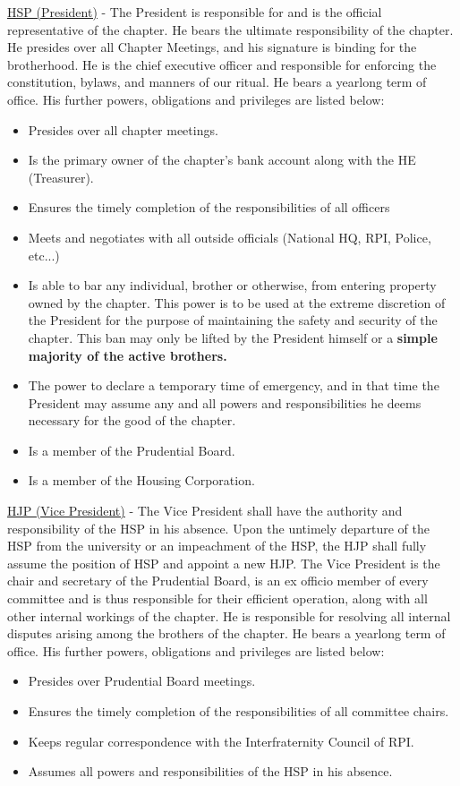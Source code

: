 \documentclass{article}
\begin{document}
\underline{HSP (President)} - The President is responsible for and is the official representative of the chapter. He bears the ultimate responsibility of the chapter. He presides over all Chapter Meetings, and his signature is binding for the brotherhood. He is the chief executive officer and responsible for enforcing the constitution, bylaws, and manners of our ritual. He bears a yearlong term of office. His further powers, obligations and privileges are listed below:
\begin{itemize}
    \item Presides over all chapter meetings.
    \item Is the primary owner of the chapter’s bank account along with the HE (Treasurer).
    \item Ensures the timely completion of the responsibilities of all officers
    \item Meets and negotiates with all outside officials (National HQ, RPI, Police, etc...)
    \item Is able to bar any individual, brother or otherwise, from entering property owned by the chapter. This power is to be used at the extreme discretion of the President for the purpose of maintaining the safety and security of the chapter. This ban may only be lifted by the President himself or a \textbf{simple majority of the active brothers.}
    \item The power to declare a temporary time of emergency, and in that time the President may assume any and all powers and responsibilities he deems necessary for the good of the chapter. 
    \item Is a member of the Prudential Board.
    \item Is a member of the Housing Corporation.
\end{itemize}

\underline{HJP (Vice President)} - The Vice President shall have the authority and responsibility of the HSP in his absence. Upon the untimely departure of the HSP from the university or an impeachment of the HSP, the HJP shall fully assume the position of HSP and appoint a new HJP. The Vice President is the chair and secretary of the Prudential Board, is an ex officio member of every committee and is thus responsible for their efficient operation, along with all other internal workings of the chapter. He is responsible for resolving all internal disputes arising among the brothers of the chapter. He bears a yearlong term of office. His further powers, obligations and privileges are listed below:
\begin{itemize}
    \item Presides over Prudential Board meetings.
    \item Ensures the timely completion of the responsibilities of all committee chairs.
    \item Keeps regular correspondence with the Interfraternity Council of RPI.
    \item Assumes all powers and responsibilities of the HSP in his absence.
\end{itemize}
\end{document}

